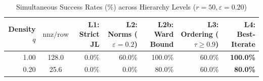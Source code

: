\begin{table}[htbp]
\centering
\small
\caption{Simultaneous Success Rates (\%) across Hierarchy Levels ($r=50, \varepsilon=0.20$)}
\label{tab:jl_hierarchy}
\begin{tabular}{rcrrrrr}
\toprule
Density $q$ & $\mathrm{nnz}/\mathrm{row}$ & L1: Strict JL & L2: Norms ($\varepsilon=0.2$) & L2b: Ward Bound & L3: Ordering ($\tau\ge 0.9$) & L4: Best-Iterate \\
\midrule
 1.00 & 128.0 &   0.0\% &  60.0\% & 100.0\% &  60.0\% & \textbf{100.0\%} \\
 0.20 &  25.6 &   0.0\% &   0.0\% &  80.0\% &  60.0\% & \textbf{ 80.0\%} \\
\bottomrule
\end{tabular}
\end{table}

